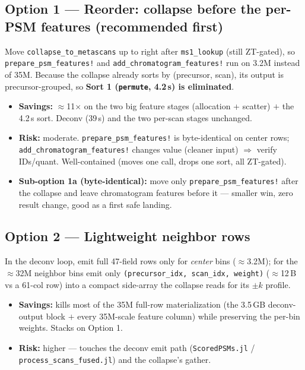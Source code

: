 \documentclass[11pt]{article}
\newcommand{\code}[1]{\texttt{\small #1}}
\begin{document}
\subsection*{Option 1 --- Reorder: collapse before the per-PSM features (recommended first)}
Move \code{collapse\_to\_metascans} up to right after \code{ms1\_lookup} (still ZT-gated),
so \code{prepare\_psm\_features!} and \code{add\_chromatogram\_features!} run on 3.2M
instead of 35M. Because the collapse already sorts by (precursor, scan), its output is
precursor-grouped, so \textbf{Sort 1 (\code{permute}, 4.2\,s) is eliminated}.
\begin{itemize}
\item \textbf{Savings:} $\approx$11$\times$ on the two big feature stages (allocation +
scatter) $+$ the 4.2\,s sort. Deconv (39\,s) and the two per-scan stages unchanged.
\item \textbf{Risk:} moderate. \code{prepare\_psm\_features!} is byte-identical on center
rows; \code{add\_chromatogram\_features!} changes value (cleaner input) $\Rightarrow$
verify IDs/quant. Well-contained (moves one call, drops one sort, all ZT-gated).
\item \textbf{Sub-option 1a (byte-identical):} move only \code{prepare\_psm\_features!}
after the collapse and leave chromatogram features before it --- smaller win, zero
result change, good as a first safe landing.
\end{itemize}

\subsection*{Option 2 --- Lightweight neighbor rows}
In the deconv loop, emit full 47-field rows only for \emph{center} bins ($\approx$3.2M);
for the $\approx$32M neighbor bins emit only \code{(precursor\_idx, scan\_idx, weight)}
($\approx$12\,B vs a 61-col row) into a compact side-array the collapse reads for its
$\pm k$ profile.
\begin{itemize}
\item \textbf{Savings:} kills most of the 35M full-row materialization (the 3.5\,GB
deconv-output block $+$ every 35M-scale feature column) while preserving the per-bin
weights. Stacks on Option 1.
\item \textbf{Risk:} higher --- touches the deconv emit path (\code{ScoredPSMs.jl} /
\code{process\_scans\_fused.jl}) and the collapse's gather.
\end{itemize}
\end{document}
